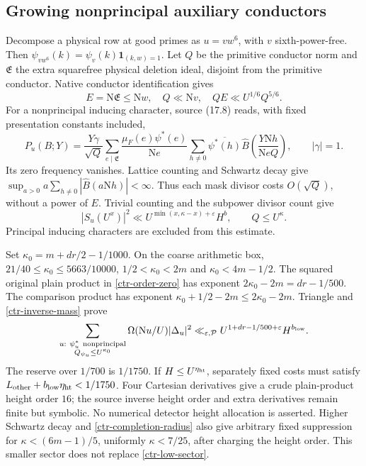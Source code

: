 \documentclass[11pt]{article}
\theoremstyle{definition}
\newcommand{\N}{\mathrm N}
\newcommand{\eps}{\varepsilon}
\newcommand{\Id}{\mathbf 1}
\newcommand{\lls}{\ll_{\eps,\mathcal P}}
\begin{document}
\subsection{Growing nonprincipal auxiliary conductors}
Decompose a physical row at good primes as $u=vw^6$, with $v$
sixth-power-free. Then
$\psi_{vw^6}(k)=\psi_v(k)\Id_{(k,w)=1}$. Let $Q$ be the primitive
conductor norm and $\mathfrak E$ the extra squarefree physical
deletion ideal, disjoint from the primitive conductor. Native conductor
identification gives
\begin{equation}\label{ctr-completion-radius}
 E=\N\mathfrak E\le\N w,\quad Q\ll\N v,\quad
 QE\ll U^{1/6}Q^{5/6}.
\end{equation}
For a nonprincipal inducing character, source (17.8) reads, with
fixed presentation constants included,
\[
 P_u(B;Y)=\frac{Y\gamma}{\sqrt Q}
 \sum_{e\mid\mathfrak E}\frac{\mu_F(e)\psi^*(e)}{\N e}
 \sum_{h\ne0}\overline{\psi^*(h)}
       \widehat B\left(\frac{Y\N h}{\N e Q}\right),
 \qquad |\gamma|=1 .
\]
Its zero frequency vanishes. Lattice counting and Schwartz decay give
$\sup_{a>0}a\sum_{h\ne0}|\widehat B(a\N h)|<\infty$.
Thus each mask divisor costs $O(\sqrt Q)$, without a power of $E$.
Trivial counting and the subpower divisor count give
\begin{equation}\label{ctr-order-zero}
 |S_u(U^x)|^2\ll U^{\min(x,\kappa-x)+\eps}H^b,
 \qquad Q\le U^\kappa .
\end{equation}
Principal inducing characters are excluded from this estimate.

Set $\kappa_0=m+dr/2-1/1000$. On the coarse arithmetic box,
$21/40\le\kappa_0\le5663/10000$,
$1/2<\kappa_0<2m$ and $\kappa_0<4m-1/2$.
The squared original plain product in \eqref{ctr-order-zero}
has exponent $2\kappa_0-2m=dr-1/500$. The comparison product
has exponent $\kappa_0+1/2-2m\le2\kappa_0-2m$.
Triangle and \eqref{ctr-inverse-mass} prove
\begin{equation}\label{ctr-low-sector}
 \sum_{\substack{u:\ \psi_u^*\ {\rm nonprincipal}\\
                       Q_{\psi_u}\le U^{\kappa_0}}}
 \Omega(\N u/U)|\Delta_u|^2
 \lls U^{1+dr-1/500+\eps}H^{b_{\rm low}}.
\end{equation}
The reserve over $1/700$ is $1/1750$. If $H\le U^{\eta_{\rm ht}}$,
separately fixed costs must satisfy
$L_{\rm other}+b_{\rm low}\eta_{\rm ht}<1/1750$.
Four Cartesian derivatives give a crude plain-product height order
$16$; the source inverse height order and extra derivatives remain
finite but symbolic. No numerical detector height allocation is asserted.
Higher Schwartz decay and \eqref{ctr-completion-radius} also give
arbitrary fixed suppression for $\kappa<(6m-1)/5$, uniformly
$\kappa<7/25$, after charging the height order. This smaller sector
does not replace \eqref{ctr-low-sector}.
\end{document}
